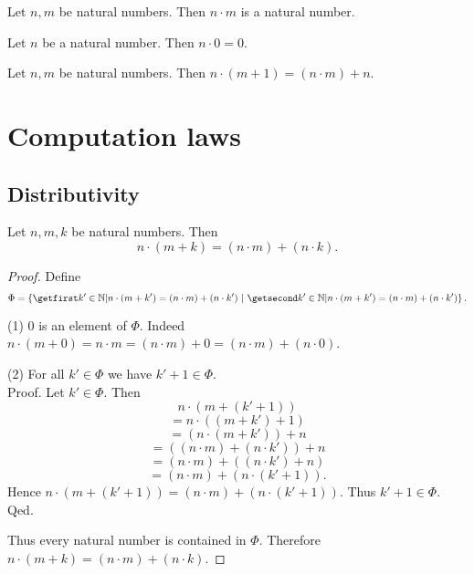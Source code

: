 \documentclass[../arithmetic.tex]{subfiles}
\begin{document}
  \begin{forthel}
    \begin{lemma}
      Let $n, m$ be natural numbers.
      Then $n \cdot m$ is a natural number.
    \end{lemma}
  \end{forthel}

  \begin{forthel}
    \begin{lemma}
      Let $n$ be a natural number.
      Then $n \cdot 0 = 0$.
    \end{lemma}
  \end{forthel}

  \begin{forthel}
    \begin{lemma}
      Let $n, m$ be natural numbers.
      Then $n \cdot (m + 1) = (n \cdot m) + n$.
    \end{lemma}
  \end{forthel}


  \section{Computation laws}

  \subsection*{Distributivity}

  \begin{forthel}
    \begin{proposition}
      Let $n, m, k$ be natural numbers.
      Then \[ n \cdot (m + k) = (n \cdot m) + (n \cdot k). \]
    \end{proposition}
    \begin{proof}
      Define \[ \Phi = \class{k' \in \Nat | n \cdot (m + k') =
      (n \cdot m) + (n \cdot k')}. \]

      (1) $0$ is an element of $\Phi$.
      Indeed $n \cdot (m + 0)
        = n \cdot m
        = (n \cdot m) + 0
        = (n \cdot m) + (n \cdot 0)$.

      (2) For all $k' \in \Phi$ we have $k' + 1 \in \Phi$. \\
      Proof.
        Let $k'\in \Phi$.
        Then
        \[  n \cdot (m + (k' + 1))                  \]
        \[    = n \cdot ((m + k') + 1)              \]
        \[    = (n \cdot (m + k')) + n              \]
        \[    = ((n \cdot m) + (n \cdot k')) + n    \]
        \[    = (n \cdot m) + ((n \cdot k') + n)    \]
        \[    = (n \cdot m) + (n \cdot (k' + 1)).   \]
        Hence $n \cdot (m + (k' + 1)) = (n \cdot m) + (n \cdot (k' + 1))$.
        Thus $k' + 1 \in \Phi$.
      Qed.

      Thus every natural number is contained in $\Phi$.
      Therefore $n \cdot (m + k) = (n \cdot m) + (n \cdot k)$.
    \end{proof}
  \end{forthel}
\end{document}
